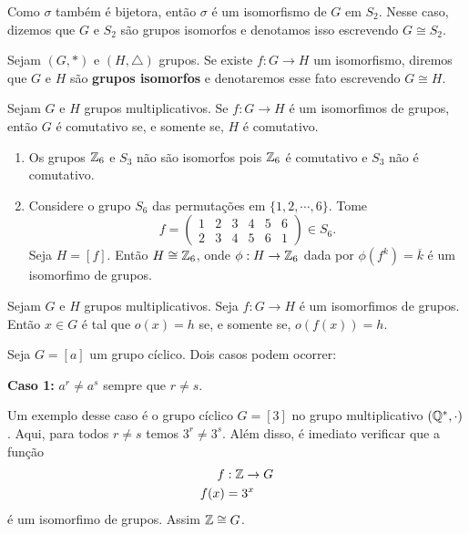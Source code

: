 \vspace{.3cm}

Como $\sigma$ também é bijetora, então $\sigma$ é um isomorfismo de $G$ em $S_2$. Nesse caso, dizemos que $G$ e $S_2$ são grupos isomorfos e denotamos isso escrevendo $G \cong S_2$.

\begin{definicao}
    Sejam $(G, *)$ e $(H, \triangle)$ grupos. Se existe $f : G \to H$ um isomorfismo, diremos que $G$ e $H$ são \textbf{grupos isomorfos} e denotaremos esse fato escrevendo $G \cong H$.
\end{definicao}

\begin{proposicao}
    Sejam $G$ e $H$ grupos multiplicativos. Se $f : G \to H$ é um isomorfimos de grupos, então $G$ é comutativo se, e somente se, $H$ é comutativo.
\end{proposicao}

\begin{exemplos}
    \begin{enumerate}[label={\arabic*})]
        \item Os grupos $\mathbb{Z}_6$ e $S_3$ não são isomorfos pois $\mathbb{Z}_6$ é comutativo e $S_3$ não é comutativo.

        \item Considere o grupo $S_6$ das permutações em $\{1, 2, \cdots, 6\}$. Tome
        \[
            f = \begin{pmatrix}
                1 & 2 & 3 & 4 & 5 & 6\\
                2 & 3 & 4 & 5 & 6 & 1
            \end{pmatrix} \in S_6.
        \]
        Seja $H = [f]$. Então $H \cong \mathbb{Z}_6$, onde $\phi : H \to \mathbb{Z}_6$ dada por $\phi(f^k) = \overline{k}$ é um isomorfimo de grupos.
    \end{enumerate}
\end{exemplos}

\begin{proposicao}
    Sejam $G$ e $H$ grupos multiplicativos. Seja $f : G \to H$ é um isomorfimos de grupos. Então $x \in G$ é tal que $o(x) = h$ se, e somente se, $o(f(x)) = h$.
\end{proposicao}

Seja $G = [a]$ um grupo cíclico. Dois casos podem ocorrer:

\textbf{Caso 1:} $a^r \ne a^s$ sempre que $r \ne s$.

Um exemplo desse caso é o grupo cíclico $G = [3]$ no grupo multiplicativo $(\mathbb{Q}^*, \cdot)$. Aqui, para todos $r \ne s$ temos $3^r \ne 3^s$. Além disso, é imediato verificar que a função
\begin{align*}
    f &: \mathbb{Z} \to G\\
    f(x) &= 3^x
\end{align*}
é um isomorfimo de grupos. Assim $\mathbb{Z} \cong G$.

